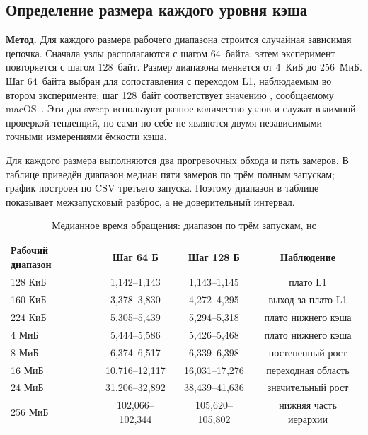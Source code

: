 \subsection{Определение размера каждого уровня кэша}

\textbf{Метод.} Для каждого размера рабочего диапазона строится случайная зависимая цепочка. Сначала узлы располагаются с шагом 64~байта, затем эксперимент повторяется с шагом 128~байт. Размер диапазона меняется от 4~КиБ до 256~МиБ. Шаг 64~байта выбран для сопоставления с переходом L1, наблюдаемым во втором эксперименте; шаг 128~байт соответствует значению , сообщаемому macOS~\cite{apple-sysctl,apple-arch}. Эти два sweep используют разное количество узлов и служат взаимной проверкой тенденций, но сами по себе не являются двумя независимыми точными измерениями ёмкости кэша.

Для каждого размера выполняются два прогревочных обхода и пять замеров. В таблице приведён диапазон медиан пяти замеров по трём полным запускам; график построен по CSV третьего запуска. Поэтому диапазон в таблице показывает межзапусковый разброс, а не доверительный интервал.


\begin{table}[H]
\centering
\small
\caption{Медианное время обращения: диапазон по трём запускам, нс}\label{tab:size}
\begin{tabular}{lccc}
\toprule
Рабочий диапазон & Шаг 64 Б & Шаг 128 Б & Наблюдение \\
\midrule
128 КиБ & 1,142--1,143 & 1,143--1,145 & плато L1 \\
160 КиБ & 3,378--3,830 & 4,272--4,295 & выход за плато L1 \\
224 КиБ & 5,305--5,439 & 5,294--5,318 & плато нижнего кэша \\
4 МиБ & 5,444--5,586 & 5,426--5,468 & плато нижнего кэша \\
8 МиБ & 6,374--6,517 & 6,339--6,398 & постепенный рост \\
16 МиБ & 10,716--12,117 & 16,031--17,276 & переходная область \\
24 МиБ & 31,206--32,892 & 38,439--41,636 & значительный рост \\
256 МиБ & 102,066--102,344 & 105,620--105,802 & нижняя часть иерархии \\
\bottomrule
\end{tabular}
\end{table}

